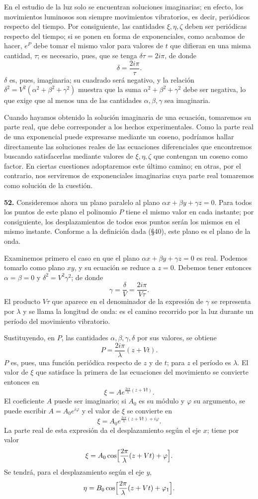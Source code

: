 En el estudio de la luz solo se encuentran soluciones imaginarias; en
efecto, los movimientos luminosos son siempre movimientos vibratorios, es
decir, periódicos respecto del tiempo. Por consiguiente, las cantidades
$\xi,\eta,\zeta$ deben ser periódicas respecto del tiempo; si se ponen en
forma de exponenciales, como acabamos de hacer, $e^P$ debe tomar el mismo
valor para valores de $t$ que difieran en una misma cantidad, $\tau$; es
necesario, pues, que se tenga $\delta\tau=2i\pi$, de donde
\[
\delta=\frac{2i\pi}{\tau}.
\]
$\delta$ es, pues, imaginaria; su cuadrado será negativo, y la relación
$\delta^2=V^2(\alpha^2+\beta^2+\gamma^2)$ muestra que la suma
$\alpha^2+\beta^2+\gamma^2$ debe ser negativa, lo que exige que al menos
una de las cantidades $\alpha,\beta,\gamma$ sea imaginaria.

Cuando hayamos obtenido la solución imaginaria de una ecuación, tomaremos
su parte real, que debe corresponder a los hechos experimentales. Como la
parte real de una exponencial puede expresarse mediante un coseno,
podríamos hallar directamente las soluciones reales de las ecuaciones
diferenciales que encontremos buscando satisfacerlas mediante valores de
$\xi,\eta,\zeta$ que contengan un coseno como factor. En ciertas
cuestiones adoptaremos este último camino; en otras, por el contrario,
nos serviremos de exponenciales imaginarias cuya parte real tomaremos
como solución de la cuestión.

\noindent\textbf{52.} Consideremos ahora un plano paralelo al plano
$\alpha x+\beta y+\gamma z=0$. Para todos los puntos de este plano el
polinomio $P$ tiene el mismo valor en cada instante; por consiguiente, los
desplazamientos de todos esos puntos serán los mismos en el mismo
instante. Conforme a la definición dada (§40), este plano es el plano de
la onda.

Examinemos primero el caso en que el plano $\alpha x+\beta y+\gamma z=0$
es real. Podemos tomarlo como plano $xy$, y su ecuación se reduce a
$z=0$. Debemos tener entonces $\alpha=\beta=0$ y $\delta^2=V^2\gamma^2$;
de donde
\[
\gamma=\frac{\delta}{V}=\frac{2i\pi}{V\tau}.
\]
El producto $V\tau$ que aparece en el denominador de la expresión de
$\gamma$ se representa por $\lambda$ y se llama la longitud de onda: es
el camino recorrido por la luz durante un período del movimiento
vibratorio.

Sustituyendo, en $P$, las cantidades $\alpha,\beta,\gamma,\delta$ por sus
valores, se obtiene
\[
P=\frac{2i\pi}{\lambda}(z+Vt).
\]
$P$ es, pues, una función periódica respecto de $z$ y de $t$; para $z$ el
período es $\lambda$. El valor de $\xi$ que satisface la primera de las
ecuaciones del movimiento se convierte entonces en
\[
\xi=Ae^{\frac{2i\pi}{\lambda}(z+Vt)}.
\]
El coeficiente $A$ puede ser imaginario; si $A_0$ es su módulo y $\varphi$
su argumento, se puede escribir $A=A_0e^{i\varphi}$ y el valor de $\xi$ se
convierte en
\[
\xi=A_0e^{\frac{2i\pi}{\lambda}(z+Vt)+i\varphi}.
\]
La parte real de esta expresión da el desplazamiento según el eje $x$;
tiene por valor
\[
\xi=A_0\cos\Bigl[\frac{2\pi}{\lambda}(z+Vt)+\varphi\Bigr].
\]
Se tendrá, para el desplazamiento según el eje $y$,
\[
\eta=B_0\cos\Bigl[\frac{2\pi}{\lambda}(z+Vt)+\varphi_1\Bigr].
\]

